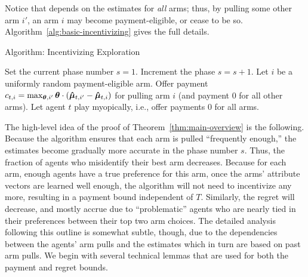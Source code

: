 Notice that  depends on the estimates for \emph{all}
arms; thus, by pulling some other arm $i'$, an arm $i$ may become
payment-eligible, or cease to be so.
Algorithm~\ref{alg:basic-incentivizing} gives the full details.


\begin{algorithm}
\caption{Algorithm: Incentivizing Exploration \label{alg:basic-incentivizing}}
\begin{algorithmic}
\STATE Set the current phase number $s = 1$.
\STATE Increment the phase $s = s + 1$.
\ENDIF
{}
\STATE Let $i$ be a uniformly random payment-eligible arm.
\STATE Offer payment
$c_{t,i} = \max_{\bm{\theta},i'} \bm{\theta} \cdot (\bm{\hat{\mu}}_{t,i'} - \bm{\hat{\mu}}_{t,i})$
for pulling arm $i$
(and payment 0 for all other arms).
\ELSE
\STATE Let agent $t$ play myopically, i.e., offer payments 0 for all arms.
\ENDIF
\ENDFOR
\end{algorithmic}
\end{algorithm}

The high-level idea of the proof of Theorem~\ref{thm:main-overview}
is the following.
Because the algorithm ensures that each arm is pulled
``frequently enough,''
the estimates  become gradually more accurate in the
phase number $s$.
Thus, the fraction of agents who misidentify their best arm decreases.
Because for each arm, enough agents have a true preference for this
arm, once the arms' attribute vectors are learned well enough,
the algorithm will not need to incentivize any more,
resulting in a payment bound independent of $T$.
Similarly, the regret will decrease, and mostly accrue
due to ``problematic'' agents who are nearly tied in their preferences
between their top two arm choices.
The detailed analysis following this outline is somewhat subtle, though,
due to the dependencies between the agents' arm pulls and the
estimates which in turn are based on past arm pulls.
We begin with several technical lemmas that are used for both the
payment and regret bounds.

